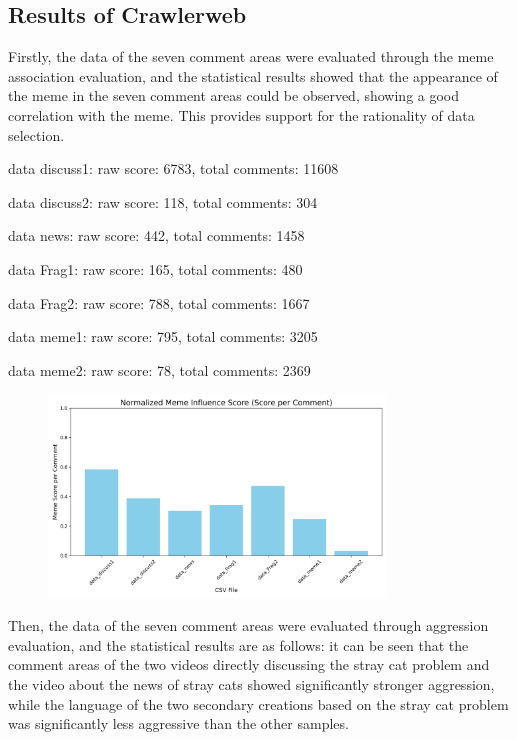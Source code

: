 \documentclass[12pt,a4paper]{ctexart}
\theoremstyle{MyLineTheoremStyle}
\theoremstyle{MyBlockTheoremStyle}
\theoremstyle{MySubsubsectionStyle}
\begin{document}

\subsection{Results of Crawlerweb}

Firstly, the data of the seven comment areas were evaluated through the meme association evaluation, and the statistical results showed that the appearance of the meme in the seven comment areas could be observed, showing a good correlation with the meme. This provides support for the rationality of data selection.

data discuss1: raw score: 6783, total comments: 11608

data discuss2: raw score: 118, total comments: 304

data news: raw score: 442, total comments: 1458

data Frag1: raw score: 165, total comments: 480

data Frag2: raw score: 788, total comments: 1667

data meme1: raw score: 795, total comments: 3205

data meme2: raw score: 78, total comments: 2369

\begin{figure}[htbp]
    \centering
    \includegraphics[width=0.8\textwidth]{img/meme_score.png}
\end{figure}
\newpage

Then, the data of the seven comment areas were evaluated through aggression evaluation, and the statistical results are as follows: it can be seen that the comment areas of the two videos directly discussing the stray cat problem and the video about the news of stray cats showed significantly stronger aggression, while the language of the two secondary creations based on the stray cat problem was significantly less aggressive than the other samples.
\end{document}
